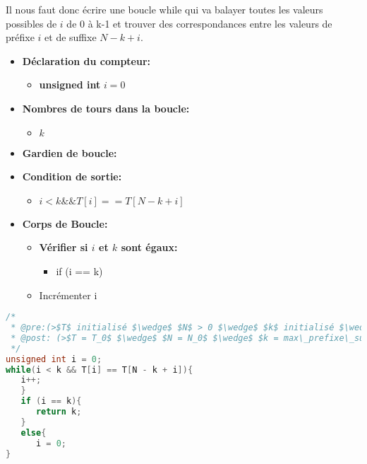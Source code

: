 \vspace{0.4cm}
Il nous faut donc écrire une boucle while qui va balayer toutes les valeurs
possibles de $i$ de 0 à k-1 et trouver des correspondances entre les
valeurs de préfixe $i$ et de suffixe $N-k+i$.
\begin{itemize}
   \item \textbf{Déclaration du compteur:}
      \begin{itemize}
         \item \textbf{unsigned int} $i = 0$
      \end{itemize}
   \item \textbf{Nombres de tours dans la boucle:}
      \begin{itemize}
         \item $k$
      \end{itemize}
   \item \textbf{Gardien de boucle:}
   \item \textbf{Condition de sortie:}
      \begin{itemize}
         \item $i < k $\space$ \&\& $\space$ T[i] == T[N - k +i]$
      \end{itemize}
   \item \textbf{Corps de Boucle:}
   \begin{itemize}
      \item \textbf{Vérifier si $i$ et $k$ sont égaux:}
      \begin{itemize}
      \item if (i == k)
      \end{itemize}
      \item Incrémenter i
   \end{itemize}
\end{itemize}

\vspace{0.4cm}
\begin{lstlisting}[language=C, caption=SP2]
/*
 * @pre:(>$T$ initialisé $\wedge$ $N$ > 0 $\wedge$ $k$ initialisé $\wedge$ $0 \leq i < k$<)
 * @post: (>$T = T_0$ $\wedge$ $N = N_0$ $\wedge$ $k = max\_prefixe\_suffixe(*T,k,N)$ $\wedge$ $k \geq 0$<)
 */
unsigned int i = 0;
while(i < k && T[i] == T[N - k + i]){
   i++;
   }
   if (i == k){
      return k;
   }
   else{
      i = 0;
}
\end{lstlisting}